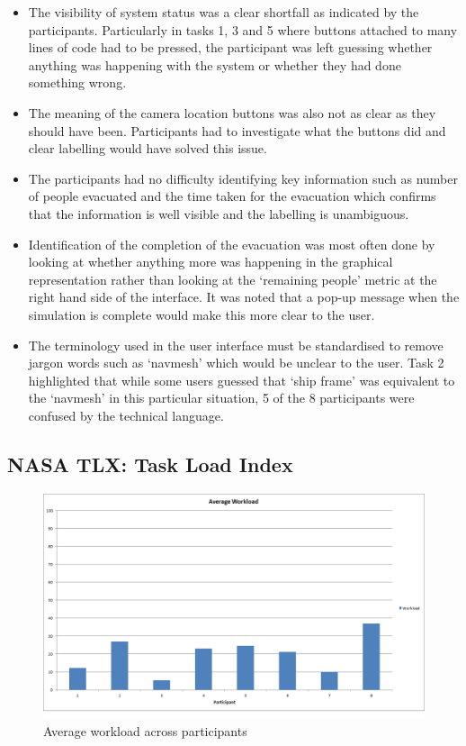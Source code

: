 \begin{itemize}
\item The visibility of system status was a clear shortfall as indicated by the participants. Particularly in tasks 1, 3 and 5 where buttons attached to many lines of code had to be pressed, the participant was left guessing whether anything was happening with the system or whether they had done something wrong.
\item The meaning of the camera location buttons was also not as clear as they should have been. Participants had to investigate what the buttons did and clear labelling would have solved this issue.
\item The participants had no difficulty identifying key information such as number of people evacuated and the time taken for the evacuation which confirms that the information is well visible and the labelling is unambiguous.
\item Identification of the completion of the evacuation was most often done by looking at whether anything more was happening in the graphical representation rather than looking at the `remaining people' metric at the right hand side of the interface. It was noted that a pop-up message when the simulation is complete would make this more clear to the user.
\item The terminology used in the user interface must be standardised to remove jargon words such as ‘navmesh’ which would be unclear to the user. Task 2 highlighted that while some users guessed that ‘ship frame’ was equivalent to the ‘navmesh’ in this particular situation, 5 of the 8 participants were confused by the technical language. 
\end{itemize}

\subsection{NASA TLX: Task Load Index}

\begin{figure}[H]
	\centering
	\includegraphics[scale=0.25]{../images/tlxresults.png}
	\caption{Average workload across participants}
\end{figure}

